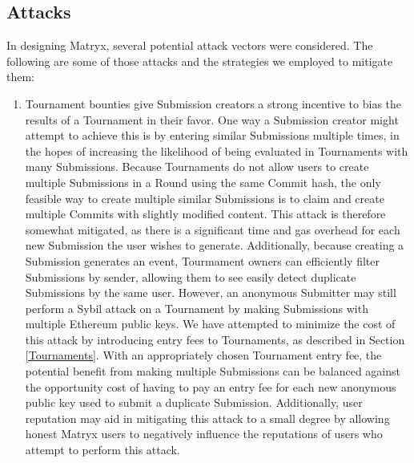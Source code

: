 \documentclass[a4paper, 10pt, conference]{ieeeconf}      %
\begin{document}
\subsection{Attacks}\label{attacks}
In designing Matryx, several potential attack vectors were considered. The following are some of those attacks and the strategies we employed to mitigate them:

\begin{enumerate}
\item  Tournament bounties give Submission creators a strong incentive to bias the results of a Tournament in their favor.
One way a Submission creator might attempt to achieve this is by entering similar Submissions multiple times, in the hopes of increasing the likelihood of being evaluated in Tournaments with many Submissions.
Because Tournaments do not allow users to create multiple Submissions in a Round using the same Commit hash, the only feasible way to create multiple similar Submissions is to claim and create multiple Commits with slightly modified content. This attack is therefore somewhat mitigated, as there is a significant time and gas overhead for each new Submission the user wishes to generate. Additionally, because creating a Submission generates an event, Tourmament owners can efficiently filter Submissions by sender, allowing them to see easily detect duplicate Submissions by the same user. However, an anonymous Submitter may still perform a Sybil attack on a Tournament by making Submissions with multiple Ethereum public keys. We have  attempted to minimize the cost of this attack by introducing entry fees to Tournaments, as described in Section \ref{Tournaments}. With an appropriately chosen Tournament entry fee, the potential benefit from making multiple Submissions can be balanced against the opportunity cost of having to pay an entry fee for each new anonymous public key used to submit a duplicate Submission. Additionally, user reputation may aid in mitigating this attack to a small degree by allowing honest Matryx users to negatively influence the reputations of users who attempt to perform this attack.

\end{enumerate}
\end{document}
